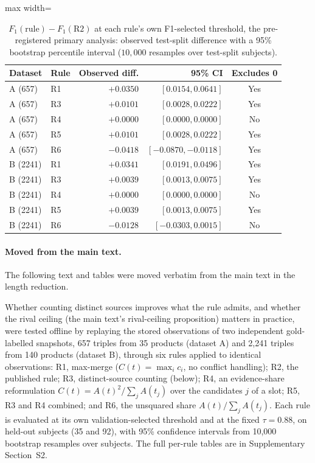 \documentclass[11pt]{article}
\begin{document}
\begin{table}[htbp]
\centering
\caption{$F_1(\text{rule}) - F_1(\text{R2})$ at each rule's own
F1-selected threshold, the pre-registered primary analysis: observed
test-split difference with a 95\% bootstrap percentile interval
($10{,}000$ resamples over test-split subjects).}
\label{tab:dec026-bootstrap-f1sel}
\begin{adjustbox}{max width=\textwidth}
\begin{tabular}{@{}llrrc@{}}
\toprule
Dataset & Rule & Observed diff. & 95\% CI & Excludes 0 \\
\midrule
A (657) & R1 & $+0.0350$ & $[0.0154, 0.0641]$ & Yes \\
A (657) & R3 & $+0.0101$ & $[0.0028, 0.0222]$ & Yes \\
A (657) & R4 & $+0.0000$ & $[0.0000, 0.0000]$ & No \\
A (657) & R5 & $+0.0101$ & $[0.0028, 0.0222]$ & Yes \\
A (657) & R6 & $-0.0418$ & $[-0.0870, -0.0118]$ & Yes \\
\midrule
B (2241) & R1 & $+0.0341$ & $[0.0191, 0.0496]$ & Yes \\
B (2241) & R3 & $+0.0039$ & $[0.0013, 0.0075]$ & Yes \\
B (2241) & R4 & $+0.0000$ & $[0.0000, 0.0000]$ & No \\
B (2241) & R5 & $+0.0039$ & $[0.0013, 0.0075]$ & Yes \\
B (2241) & R6 & $-0.0128$ & $[-0.0303, 0.0015]$ & No \\
\bottomrule
\end{tabular}
\end{adjustbox}
\end{table}



\paragraph{Moved from the main text.} The following text and tables were moved verbatim from the main text in the length reduction.

Whether counting distinct sources improves what the rule admits, and
whether the rival ceiling (the main text's rival-ceiling proposition) matters in
practice, were tested offline by replaying the stored observations of two independent
gold-labelled snapshots, 657 triples from 35 products (dataset A) and
2,241 triples from 140 products (dataset B), through six rules applied
to identical observations: R1, max-merge ($C(t)=\max_i c_i$, no conflict
handling); R2, the published rule; R3, distinct-source counting
(below); R4, an evidence-share reformulation
$C(t)=A(t)^2/\sum_j A(t_j)$ over the candidates $j$ of a slot; R5, R3 and
R4 combined; and R6, the unsquared share $A(t)/\sum_j A(t_j)$. Each rule
is evaluated at its own validation-selected threshold and at the fixed
$\tau=0.88$, on held-out subjects (35 and 92), with 95\% confidence
intervals from 10,000 bootstrap resamples over subjects. The full
per-rule tables are in Supplementary Section~S2.
\end{document}
